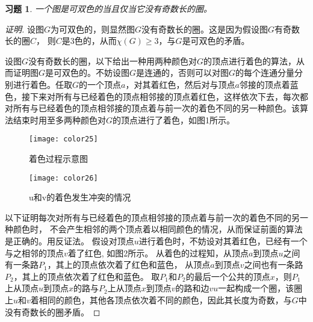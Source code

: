 \documentclass{article}
\begin{document}
\begin{CJK}{UTF8}{gbsn}
\newtheorem*{Ex}{习题}
\begin{Ex}
  一个图是可双色的当且仅当它没有奇数长的圈。
\end{Ex}
\begin{proof}[证明]
  设图$G$为可双色的，则显然图$G$没有奇数长的圈。这是因为假设图$G$有奇数长的圈$C$，
  则$C$是3色的，从而$\chi(G) \geq 3$，与$G$是可双色的矛盾。

  设图$G$没有奇数长的圈，以下给出一种用两种颜色对$G$的顶点进行着色的算法，从而证明图$G$是可双色的。不妨设图$G$是连通的，否则可以对图$G$的每个连通分量分别进行着色。任取$G$的一个顶点$a$，对其着红色，然后对与顶点$a$邻接的顶点着蓝色，接下来对所有与已经着色的顶点相邻接的顶点着红色，这样依次下去，每次都对所有与已经着色的顶点相邻接的顶点着与前一次的着色不同的另一种颜色。该算法结束时用至多两种颜色对$G$的顶点进行了着色，如图1所示。
  \begin{figure}
  \begin{minipage}{0.49\linewidth}
    \centering
  \texttt{[image: color25]}    
    \caption{着色过程示意图}
    \label{fig:coloring}  
  \end{minipage}
  \begin{minipage}{0.49\linewidth}
  \centering
      \texttt{[image: color26]}
  \caption{u和v的着色发生冲突的情况}
  \label{fig:collision}
  \end{minipage}
\end{figure}    
以下证明每次对所有与已经着色的顶点相邻接的顶点着与前一次的着色不同的另一种颜色时，
不会产生相邻的两个顶点着以相同颜色的情况，从而保证前面的算法是正确的。用反证法。
假设对顶点$u$进行着色时，不妨设对其着红色，已经有一个与之相邻的顶点$v$着了红色,
如图2所示。
从着色的过程知，从顶点$a$到顶点$u$之间有一条路$P_1$，其上的顶点依次着了红色和蓝色，
从顶点$a$到顶点$v$之间也有一条路$P_2$，其上的顶点依次着了红色和蓝色。
取$P_1$和$P_2$的最后一个公共的顶点$x$，则$P_1$上从顶点$u$到顶点$x$的路与$P_2$上从顶点$x$到顶点$v$的路和边$vu$一起构成一个圈，该圈上$u$和$v$着相同的颜色，其他各顶点依次着不同的颜色，因此其长度为奇数，与$G$中没有奇数长的圈矛盾。
  
\end{proof}
\end{CJK}
\end{document}
